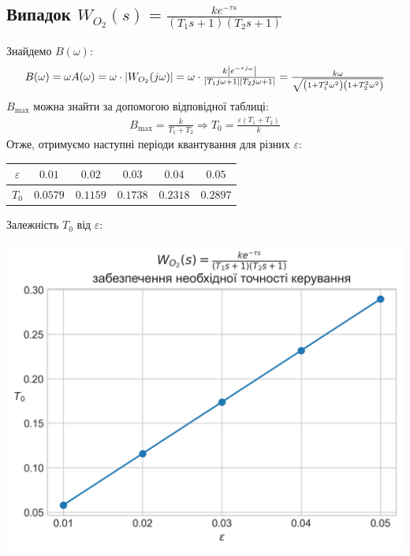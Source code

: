 \subsection{Випадок \texorpdfstring{$W_{O_2}(s) = \frac{k e^{-\tau s}}{(T_1 s + 1)(T_2 s + 1)}$}{2}}
Знайдемо $B(\omega)$:
\begin{gather}
    \mbox{\normalsize $B(\omega) = \omega A(\omega) = \omega \cdot \left| W_{O_2}(j \omega)\right| = 
    \omega \cdot \frac{
        k \left| e^{-\tau j \omega}\right|
    }{
        \left|T_1 j \omega + 1\right| \left|T_2 j \omega + 1\right|
    } = \frac{k \omega}{\sqrt{\left(1 + T_1^2 \omega^2\right)\left(1 + T_2^2 \omega^2\right)}}$}
\end{gather}
$B_{\max}$ можна знайти за допомогою відповідної таблиці:
\begin{gather}
    B_{\max} = \frac{k}{T_1 + T_2} \Rightarrow T_0 = \frac{\varepsilon (T_1 + T_2)}{k}
\end{gather}
Отже, отримуємо наступні періоди квантування для різних $\varepsilon$:
\begin{center}
    \begin{tabular}{|c|c|c|c|c|c|}
        \hline
        $\varepsilon$ & $0.01$ & $0.02$ & $0.03$ & $0.04$ & $0.05$ \\
        \hline
        $T_0$ & $0.0579$ & $0.1159$ & $0.1738$ & $0.2318$ & $0.2897$ \\
        \hline
    \end{tabular}
\end{center}
Залежність $T_0$ від $\varepsilon$:
\begin{center}
    \includegraphics[scale=0.9]{pics/W_02_accur.png}
\end{center}

